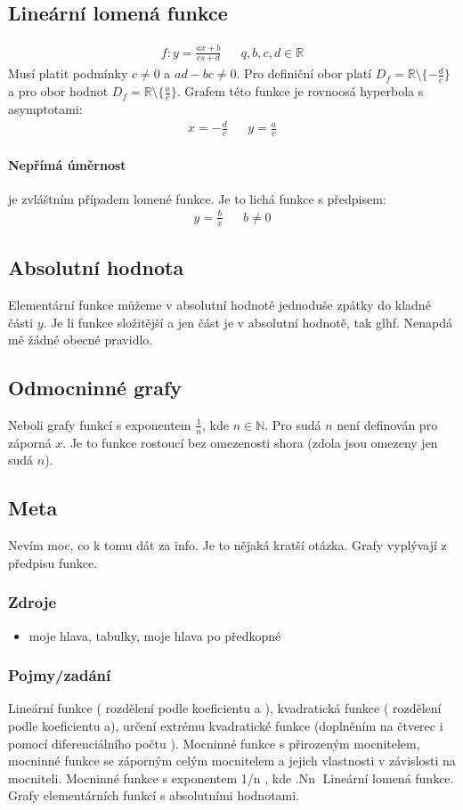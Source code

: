 \documentclass[12pt]{article}
\newcommand{\nR}{\mathbb{R}} %
\newcommand{\nN}{\mathbb{N}} %
\begin{document}
\subsection{Lineární lomená funkce}
\begin{align}
f: y= \frac{ax+b}{cs+d} && q,b,c,d \in \nR
\end{align}
Musí platit podmínky $c \neq 0$ a $ad-bc \neq0$. Pro definiční obor platí $D_f = \nR \setminus \{- \frac{d}{c} \}$ a pro obor hodnot  $D_f = \nR \setminus \{ \frac{a}{c} \}$. Grafem této funkce je rovnoosá hyperbola s asymptotami:
\begin{align}
x = - \frac{d}{c} && y =\frac{a}{c}
\end{align}
\paragraph{Nepřímá úměrnost} je zvláštním případem lomené funkce. Je to lichá funkce s předpisem:
\begin{align}
y = \frac{b}{x} && b \neq 0
\end{align}
\subsection{Absolutní hodnota}
Elementární funkce můžeme v absolutní hodnotě jednoduše zpátky do kladné části $y$. Je li funkce složitější a jen část je v absolutní hodnotě, tak  glhf. Nenapdá mě žádné obecné pravidlo.
\subsection{Odmocninné grafy}
Neboli grafy funkcí s exponentem $\frac{1}{n}$, kde $n \in \nN$. Pro sudá $n$ není definován pro záporná $x$. Je to funkce rostoucí bez omezenosti shora (zdola jsou omezeny jen sudá $n$).
\subsection{Meta}
Nevím moc, co k tomu dát za info. Je to nějaká kratší otázka. Grafy vyplývají z předpisu funkce.
\subsubsection{Zdroje}
\begin{itemize}
\item moje hlava, tabulky, moje hlava po předkopné
\end{itemize}
\subsubsection{Pojmy/zadání}
Lineární funkce ( rozdělení podle koeficientu a ), kvadratická funkce ( rozdělení podle koeficientu a), určení extrému kvadratické funkce (doplněním na čtverec i pomocí diferenciálního počtu ). Mocninné funkce s přirozeným mocnitelem, mocninné funkce se záporným celým mocnitelem a jejich vlastnosti v závislosti na mocniteli. Mocninné funkce s exponentem 1/n , kde .Nn Lineární lomená funkce. Grafy elementárních funkcí s absolutními hodnotami.
\end{document}
